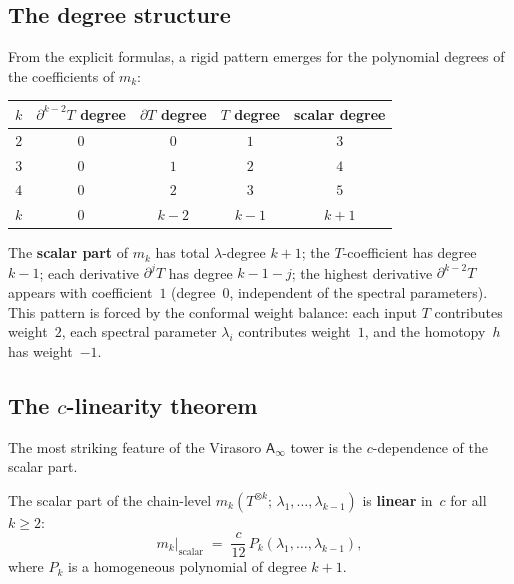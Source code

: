 \documentclass[11pt]{article}
\newcommand{\Ainf}{\mathsf{A}_{\infty}}
\begin{document}
\subsection*{The degree structure}

From the explicit formulas, a rigid pattern emerges for the
polynomial degrees of the coefficients of $m_k$:

\begin{center}
\small
\renewcommand{\arraystretch}{1.15}
\begin{tabular}{@{}ccccc@{}}
$k$ & $\partial^{k-2}T$ degree &
  $\partial T$ degree & $T$ degree & scalar degree \\
\hline
$2$ & $0$ & $0$ & $1$ & $3$ \\
$3$ & $0$ & $1$ & $2$ & $4$ \\
$4$ & $0$ & $2$ & $3$ & $5$ \\
$k$ & $0$ & $k-2$ & $k-1$ & $k+1$
\end{tabular}
\end{center}

\noindent
The \textbf{scalar part} of $m_k$ has total $\lambda$-degree
$k+1$; the $T$-coefficient has degree $k-1$; each derivative
$\partial^j T$ has degree $k-1-j$; the highest derivative
$\partial^{k-2}T$ appears with coefficient~$1$
(degree~$0$, independent of the spectral parameters).  This
pattern is forced by the conformal weight balance: each input $T$
contributes weight~$2$, each spectral parameter $\lambda_i$
contributes weight~$1$, and the homotopy~$h$ has weight~$-1$.

\subsection*{The $c$-linearity theorem}

The most striking feature of the Virasoro $\Ainf$ tower is
the $c$-dependence of the scalar part.

\begin{theorem}\label{thm:c-linearity-wn}
The scalar part of the chain-level $m_k(T^{\otimes k};\,
\lambda_1, \ldots, \lambda_{k-1})$ is \textbf{linear} in~$c$
for all $k \ge 2$:
\begin{equation}\label{eq:c-linearity-wn}
m_k\big|_{\text{scalar}}
\;=\;
\frac{c}{12}\,P_k(\lambda_1, \ldots, \lambda_{k-1}),
\end{equation}
where $P_k$ is a homogeneous polynomial of degree $k+1$.
\end{theorem}
\end{document}
